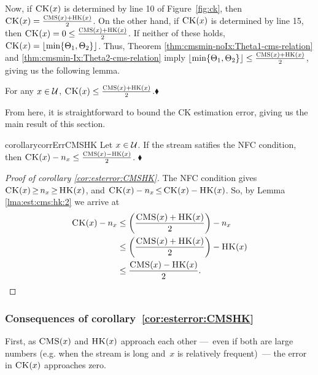 \noindent
Now, if $\textnormal{\textsc{CK}}(x)$ is determined by line 10 of Figure~\ref{fig:ck}, then $\textnormal{\textsc{CK}}(x) = \frac{\textnormal{\textsc{CMS}}(x) + \textnormal{\textsc{HK}}(x)}{2}$.  On the other hand, if $\textnormal{\textsc{CK}}(x)$ is determined by line 15, then
$\textnormal{\textsc{CK}}(x)= 0 \leq \frac{\textnormal{\textsc{CMS}}(x) + \textnormal{\textsc{HK}}(x)}{2}$.  If neither of these holds, $\CK(x)=\floor(\min \{\Theta_1, \Theta_2\})$. Thus, Theorem \ref{thm:cmsmin-noIx:Theta1-cms-relation} and \ref{thm:cmsmin-Ix:Theta2-cms-relation} imply 
$\floor(\min \{\Theta_1, \Theta_2\}) \leq \frac{\CMS(x) + \HK(x)}{2}$, giving us the following lemma.
\begin{lemma}\label{lma:est:cms:hk:2}For any $x \in \mathcal{U}$, $\textnormal{\textsc{CK}}(x) \leq \frac{\textnormal{\textsc{CMS}}(x) + \textnormal{\textsc{HK}}(x)}{2}$.\hfill$\blacklozenge$
\end{lemma}

\noindent
From here, it is straightforward to bound the CK estimation error, giving us the main result of this section. 
\begin{restatable}{corollary}{corrErrCMSHK}\label{cor:esterror:CMSHK}
	Let $x \in \mathcal{U}$.  If the stream satifies the NFC condition, then $\textnormal{\textsc{CK}}(x) - n_x \leq \frac{\textnormal{\textsc{CMS}}(x) - \textnormal{\textsc{HK}}(x)}{2}$. \hfill$\blacklozenge$
\end{restatable}

\begin{proof}[Proof of corollary \ref{cor:esterror:CMSHK}]
	The NFC condition gives $\textnormal{\textsc{CK}}(x)  \,{\geq}\,  n_x \,{\geq}\,  \textnormal{\textsc{HK}}(x)$, and
	$\textnormal{\textsc{CK}}(x) - n_x \,{\leq}\, \textnormal{\textsc{CK}}(x)- \textnormal{\textsc{HK}}(x)$. So, by Lemma \ref{lma:est:cms:hk:2} we arrive at
\begin{align*}
	\textnormal{\textsc{CK}}(x) - n_x &\leq \left(\frac{\textnormal{\textsc{CMS}}(x) + \textnormal{\textsc{HK}}(x)}{2}\right) - n_x \\
		&\leq \left(\frac{\textnormal{\textsc{CMS}}(x) + \textnormal{\textsc{HK}}(x)}{2}\right) - \textnormal{\textsc{HK}}(x)\\
	&\leq \frac{\textnormal{\textsc{CMS}}(x) - \textnormal{\textsc{HK}}(x)}{2}.
\end{align*}
\end{proof}


\subsubsection{Consequences of corollary~\ref{cor:esterror:CMSHK}}
First, as $\textnormal{\textsc{CMS}}(x)$ and $\textnormal{\textsc{HK}}(x)$ approach each other ---~even if both are large numbers (e.g. when the stream is long and~$x$ is relatively frequent)~--- the error in $\textnormal{\textsc{CK}}(x)$ approaches zero.

